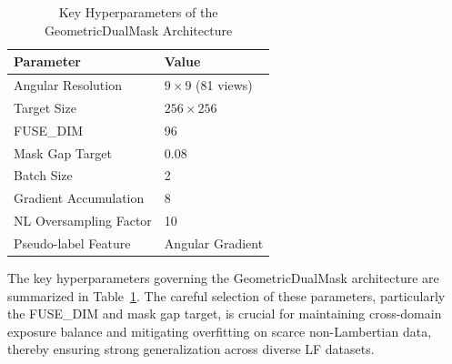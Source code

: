 \begin{table}[!t]
\caption{Key Hyperparameters of the GeometricDualMask Architecture}
\label{tab:hyperparams}
\centering
\begin{tabular}{@{}ll@{}}
\toprule
\textbf{Parameter} & \textbf{Value} \\
\midrule
Angular Resolution & $9 \times 9$ (81 views) \\
Target Size & $256 \times 256$ \\
FUSE\_DIM & 96 \\
Mask Gap Target & 0.08 \\
Batch Size & 2 \\
Gradient Accumulation & 8 \\
NL Oversampling Factor & 10 \\
Pseudo-label Feature & Angular Gradient \\
\bottomrule
\end{tabular}
\end{table}

The key hyperparameters governing the GeometricDualMask architecture are summarized in Table~\ref{tab:hyperparams}. The careful selection of these parameters, particularly the FUSE\_DIM and mask gap target, is crucial for maintaining cross-domain exposure balance and mitigating overfitting on scarce non-Lambertian data, thereby ensuring strong generalization across diverse LF datasets.

